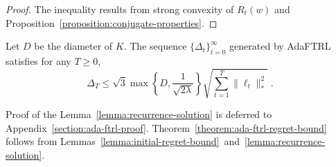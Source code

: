 \begin{proof}
The inequality results from strong convexity of $R_t(w)$ and
Proposition~\ref{proposition:conjugate-properties}.
\end{proof}

\begin{lemma}
\label{lemma:recurrence-solution}
Let $D$ be the diameter of $K$. The sequence $\{\Delta_t\}_{t=0}^\infty$
generated by AdaFTRL satisfies for any $T \ge 0$,
$$
\Delta_T \le \sqrt{3} \max\left\{D, \frac{1}{\sqrt{2\lambda}} \right\} \sqrt{\sum_{t=1}^T \|\ell_t\|_*^2} \; .
$$
\end{lemma}
%
Proof of the Lemma~\ref{lemma:recurrence-solution} is deferred to
Appendix~\ref{section:ada-ftrl-proof}.
Theorem~\ref{theorem:ada-ftrl-regret-bound} follows from
Lemmas~\ref{lemma:initial-regret-bound}~and~\ref{lemma:recurrence-solution}.
